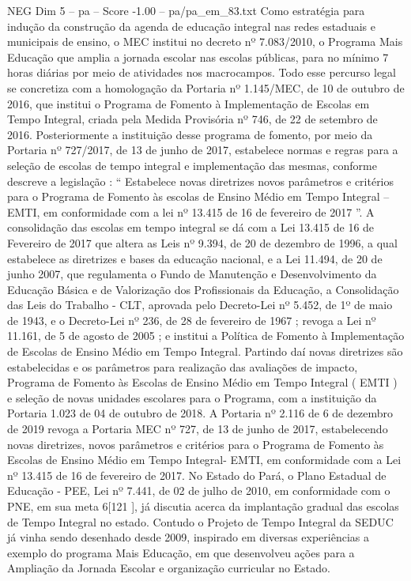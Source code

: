 \begin{textsample}{NEG Dim 5 – pa – Score -1.00 – pa/pa\_em\_83.txt}
Como estratégia para indução da construção da agenda de educação integral nas redes estaduais e municipais de ensino, o MEC institui no decreto nº 7.083/2010, o Programa Mais Educação que amplia a jornada escolar nas escolas públicas, para no mínimo 7 horas diárias por meio de atividades nos macrocampos.
Todo esse percurso legal se concretiza com a homologação da Portaria nº 1.145/MEC, de 10 de outubro de 2016, que institui o Programa de Fomento à Implementação de Escolas em Tempo Integral, criada pela Medida Provisória nº 746, de 22 de setembro de 2016.
Posteriormente a instituição desse programa de fomento, por meio da Portaria nº 727/2017, de 13 de junho de 2017, estabelece normas e regras para a seleção de escolas de tempo integral e implementação das mesmas, conforme descreve a legislação : “ Estabelece novas diretrizes novos parâmetros e critérios para o Programa de Fomento às escolas de Ensino Médio em Tempo Integral – EMTI, em conformidade com a lei nº 13.415 de 16 de fevereiro de 2017 ”.
A consolidação das escolas em tempo integral se dá com a Lei 13.415 de 16 de Fevereiro de 2017 que altera as Leis nº 9.394, de 20 de dezembro de 1996, a qual estabelece as diretrizes e bases da educação nacional, e a Lei 11.494, de 20 de junho 2007, que regulamenta o Fundo de Manutenção e Desenvolvimento da Educação Básica e de Valorização dos Profissionais da Educação, a Consolidação das Leis do Trabalho - CLT, aprovada pelo Decreto-Lei nº 5.452, de 1º de maio de 1943, e o Decreto-Lei nº 236, de 28 de fevereiro de 1967 ; revoga a Lei nº 11.161, de 5 de agosto de 2005 ; e institui a Política de Fomento à Implementação de Escolas de Ensino Médio em Tempo Integral.
Partindo daí novas diretrizes são estabelecidas e os parâmetros para realização das avaliações de impacto, Programa de Fomento às Escolas de Ensino Médio em Tempo Integral ( EMTI ) e seleção de novas unidades escolares para o Programa, com a instituição da Portaria 1.023 de 04 de outubro de 2018.
A Portaria nº 2.116 de 6 de dezembro de 2019 revoga a Portaria MEC nº 727, de 13 de junho de 2017, estabelecendo novas diretrizes, novos parâmetros e critérios para o Programa de Fomento às Escolas de Ensino Médio em Tempo Integral- EMTI, em conformidade com a Lei nº 13.415 de 16 de fevereiro de 2017.
No Estado do Pará, o Plano Estadual de Educação - PEE, Lei nº 7.441, de 02 de julho de 2010, em conformidade com o PNE, em sua meta 6[121 ], já discutia acerca da implantação gradual das escolas de Tempo Integral no estado.
Contudo o Projeto de Tempo Integral da SEDUC já vinha sendo desenhado desde 2009, inspirado em diversas experiências a exemplo do programa Mais Educação, em que desenvolveu ações para a Ampliação da Jornada Escolar e organização curricular no Estado.

\end{textsample}
